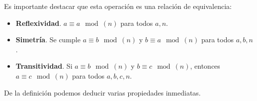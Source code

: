 Es importante destacar que esta operación es una relación de equivalencia:

\begin{itemize}
	\item \textbf{Reflexividad}. $a \equiv a \mod(n)$ para todos $a, n$.
	
	\item \textbf{Simetría}. Se cumple $a \equiv b \mod(n)$ y $b \equiv a \mod(n)$ para todos $a, b, n$.
	
	\item \textbf{Transitividad}. Si $a \equiv b \mod(n)$ y $b \equiv c \mod(n)$, entonces $a \equiv c \mod(n)$ para todos $a, b, c, n$.
\end{itemize}

De la definición podemos deducir varias propiedades inmediatas.

